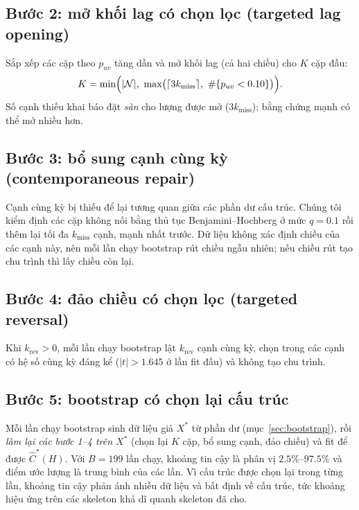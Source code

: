 \subsection{Bước 2: mở khối lag có chọn lọc (targeted lag opening)}
Sắp xếp các cặp theo $p_{uv}$ tăng dần và mở khối lag (cả hai chiều) cho $K$ cặp đầu:
\begin{equation}
K=\min\Bigl(|\mathcal N|,\ \max\bigl(\lceil 3k_{\text{miss}}\rceil,\ \#\{p_{uv}<0.10\}\bigr)\Bigr).
\end{equation}
Số cạnh thiếu khai báo đặt \emph{sàn} cho lượng được mở ($3k_{\text{miss}}$); bằng chứng mạnh có thể mở nhiều hơn.

\subsection{Bước 3: bổ sung cạnh cùng kỳ (contemporaneous repair)}
Cạnh cùng kỳ bị thiếu để lại tương quan giữa các phần dư cấu trúc. Chúng tôi kiểm định các cặp không nối bằng thủ tục Benjamini--Hochberg \citep{benjamini1995controlling} ở mức $q=0.1$ rồi thêm lại tối đa $k_{\text{miss}}$ cạnh, mạnh nhất trước. Dữ liệu không xác định chiều của các cạnh này, nên mỗi lần chạy bootstrap rút chiều ngẫu nhiên; nếu chiều rút tạo chu trình thì lấy chiều còn lại.

\subsection{Bước 4: đảo chiều có chọn lọc (targeted reversal)}
Khi $k_{\text{rev}}>0$, mỗi lần chạy bootstrap lật $k_{\text{rev}}$ cạnh cùng kỳ, chọn trong các cạnh có hệ số cùng kỳ đáng kể ($|t|>1.645$ ở lần fit đầu) và không tạo chu trình.

\subsection{Bước 5: bootstrap có chọn lại cấu trúc}
Mỗi lần chạy bootstrap sinh dữ liệu giả $X^*$ từ phần dư (mục~\ref{sec:bootstrap}), rồi \emph{làm lại các bước 1--4 trên $X^*$} (chọn lại $K$ cặp, bổ sung cạnh, đảo chiều) và fit để được $\hat C^*(H)$. Với $B=199$ lần chạy, khoảng tin cậy là phân vị $2.5\%$--$97.5\%$ và điểm ước lượng là trung bình của các lần. Vì cấu trúc được chọn lại trong từng lần, khoảng tin cậy phản ánh nhiễu dữ liệu và bất định về cấu trúc, tức khoảng hiệu ứng trên các skeleton khả dĩ quanh skeleton đã cho.

